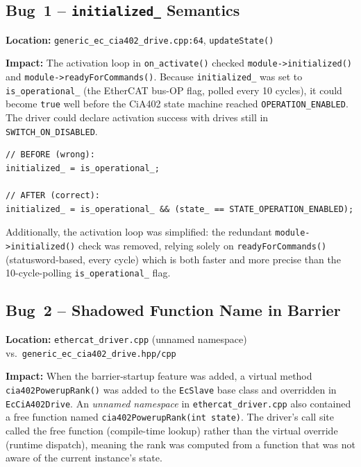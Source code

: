 \documentclass[11pt,a4paper]{article}
\begin{document}
\subsection{Bug~1 -- \texttt{initialized\_} Semantics}
\label{sec:bug1}

\textbf{Location:} \texttt{generic\_ec\_cia402\_drive.cpp:64},
\texttt{updateState()}

\textbf{Impact:} The activation loop in \texttt{on\_activate()} checked
\texttt{module->initialized()} and \texttt{module->readyForCommands()}.
Because \texttt{initialized\_} was set to \texttt{is\_operational\_} (the
EtherCAT bus-OP flag, polled every 10 cycles), it could become
\texttt{true} well before the CiA402 state machine reached
\texttt{OPERATION\_ENABLED}.  The driver could declare activation success with
drives still in \texttt{SWITCH\_ON\_DISABLED}.

\begin{lstlisting}[caption={Bug~1: before and after}]
// BEFORE (wrong):
initialized_ = is_operational_;

// AFTER (correct):
initialized_ = is_operational_ && (state_ == STATE_OPERATION_ENABLED);
\end{lstlisting}

Additionally, the activation loop was simplified: the redundant
\texttt{module->initialized()} check was removed, relying solely on
\texttt{readyForCommands()} (statusword-based, every cycle) which is both
faster and more precise than the 10-cycle-polling \texttt{is\_operational\_}
flag.

\subsection{Bug~2 -- Shadowed Function Name in Barrier}
\label{sec:bug2}

\textbf{Location:} \texttt{ethercat\_driver.cpp} (unnamed namespace) vs.\
\texttt{generic\_ec\_cia402\_drive.hpp/cpp}

\textbf{Impact:} When the barrier-startup feature was added, a virtual method
\texttt{cia402PowerupRank()} was added to the \texttt{EcSlave} base class
and overridden in \texttt{EcCiA402Drive}.  An \emph{unnamed namespace} in
\texttt{ethercat\_driver.cpp} also contained a free function named
\texttt{cia402PowerupRank(int state)}.  The driver's call site called the
free function (compile-time lookup) rather than the virtual override
(runtime dispatch), meaning the rank was computed from a function that was
not aware of the current instance's state.
\end{document}
